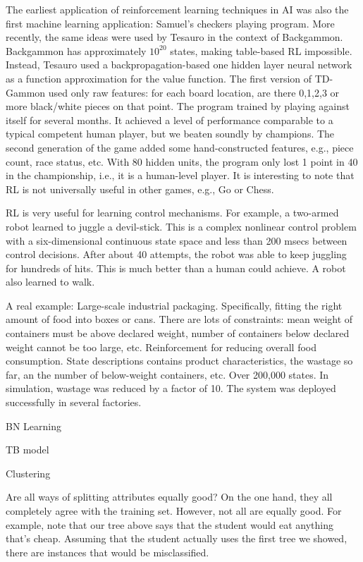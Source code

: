The earliest application of reinforcement learning techniques in AI
was also the first machine learning application: Samuel's checkers
playing program.  More recently, the same ideas were used by Tesauro
in the context of Backgammon.  Backgammon has approximately $10^{20}$
states, making table-based RL impossible.  Instead, Tesauro used a
backpropagation-based one hidden layer neural network as a
function approximation for the value function.  The first version of
TD-Gammon used only raw features: for each board location, are there 0,1,2,3
or more black/white pieces on that point.  The program trained by playing
against itself for several months.  It achieved a level of performance
comparable to a typical competent human player, but we beaten soundly by
champions.   The second generation of the game added some
hand-constructed features, e.g., piece count, race status, etc.
With 80 hidden units, the program only lost 1 point in 40 in the
championship, i.e., it is a human-level player.  It is interesting to note
that RL is not universally useful in other games, e.g., Go or Chess.

RL is very useful for learning control mechanisms.  For example, a two-armed
robot learned to juggle a devil-stick.  This is a complex nonlinear control
problem with a six-dimensional continuous state space and less than 200
msecs between control decisions.  After about 40 attempts, the robot was
able to keep juggling for hundreds of hits.  This is much better than a
human could achieve.  A robot also learned to walk.


A real example: Large-scale industrial packaging.
Specifically, fitting the right amount of food into boxes or cans.
There are lots of constraints: mean weight of containers must be above
declared weight, number of containers below declared weight cannot be
too large, etc.  Reinforcement for reducing overall food consumption.
State descriptions contains product characteristics, the wastage so far, an
the number of below-weight containers, etc.  Over 200,000 states.  In
simulation, wastage was reduced by a factor of 10.  The system was deployed
successfully in several factories. 

BN Learning

TB model

Clustering




Are all ways of splitting
attributes equally good?  On the one hand, they all completely agree with
the training set.  However, not all are equally good.  For example,
note that our tree above says that the student would eat anything
that's cheap.  Assuming that the student actually uses the first tree
we showed, there are instances that would be misclassified.

